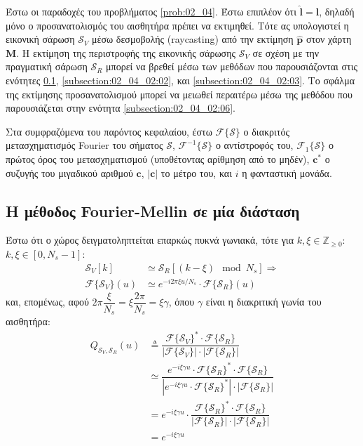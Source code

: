 Έστω οι παραδοχές του προβλήματος \ref{prob:02_04}. Έστω επιπλέον ότι $\hat{\bm{l}} =
\bm{l}$, δηλαδή μόνο ο προσανατολισμός του αισθητήρα πρέπει να εκτιμηθεί. Τότε
ας υπολογιστεί η εικονική σάρωση $\mathcal{S}_V$ μέσω δεσμοβολής (raycasting)
από την εκτίμηση $\hat{\bm{p}}$ στον χάρτη $\bm{M}$. Η εκτίμηση της περιστροφής
της εικονικής σάρωσης $\mathcal{S}_V$ σε σχέση με την πραγματική σάρωση
$\mathcal{S}_R$ μπορεί να βρεθεί μέσω των μεθόδων που παρουσιάζονται στις
ενότητες \ref{subsection:02_04_02:01}, \ref{subsection:02_04_02:02}, και
\ref{subsection:02_04_02:03}. Το σφάλμα της εκτίμησης προσανατολισμού μπορεί να
μειωθεί περαιτέρω μέσω της μεθόδου που παρουσιάζεται στην ενότητα
\ref{subsection:02_04_02:06}.

Στα συμφραζόμενα του παρόντος κεφαλαίου, έστω $\mathcal{F}\{\mathcal{S}\}$ ο
διακριτός μετασχηματισμός Fourier του σήματος $\mathcal{S}$,
$\mathcal{F}^{-1}\{\mathcal{S}\}$ ο αντίστροφός του,
$\mathcal{F}_1\{\mathcal{S}\}$ ο πρώτος όρος του μετασχηματισμού (υποθέτοντας
αρίθμηση από το μηδέν), $\bm{c}^\ast$ ο συζυγής του μιγαδικού αριθμού $\bm{c}$,
$|\bm{c}|$ το μέτρο του, και $i$ η φανταστική μονάδα.

\subsection{Η μέθοδος Fourier-Mellin σε μία διάσταση}
\label{subsection:02_04_02:01}

Έστω ότι ο χώρος δειγματοληπτείται επαρκώς πυκνά γωνιακά, τότε για
$k,\xi \in \mathbb{Z}_{\geq 0}$: $k,\xi \in [0, N_s-1]$:
\begin{align}
  \mathcal{S}_V[k] &\simeq \mathcal{S}_R[(k - \xi) \mod N_s] \Rightarrow \nonumber \\
  \mathcal{F}\{\mathcal{S}_V\}(u) &\simeq e^{-i 2\pi \xi u / N_s} \cdot \mathcal{F}\{\mathcal{S}_R\}(u) \nonumber
\end{align}
και, επομένως, αφού $2\pi \dfrac{\xi}{N_s} = \xi \dfrac{2\pi}{N_s} = \xi \gamma$,
όπου $\gamma$ είναι η διακριτική γωνία του αισθητήρα:
\begin{align}
  Q_{\mathcal{S}_V, \mathcal{S}_R}(u) & \triangleq \dfrac{\mathcal{F}\{\mathcal{S}_V\}^{\ast} \cdot \mathcal{F}\{\mathcal{S}_R\}}{|\mathcal{F}\{\mathcal{S}_V\}| \cdot |\mathcal{F}\{\mathcal{S}_R\}|} \nonumber \\
  &\simeq \dfrac{e^{-i \xi \gamma u} \cdot \mathcal{F}\{\mathcal{S}_R\}^\ast \cdot \mathcal{F}\{\mathcal{S}_R\}}{|e^{- i \xi \gamma u} \cdot \mathcal{F}\{\mathcal{S}_R\}^\ast | \cdot | \mathcal{F}\{\mathcal{S}_R\}|} \nonumber \\
  &= e^{-i \xi \gamma u} \cdot \dfrac{\mathcal{F}\{\mathcal{S}_R\}^\ast \cdot \mathcal{F}\{\mathcal{S}_R\}}{|\mathcal{F}\{\mathcal{S}_R\} | \cdot | \mathcal{F}\{\mathcal{S}_R\}|} \nonumber \\
  &= e^{-i \xi \gamma u}
  \label{eq:Q0}
\end{align}


